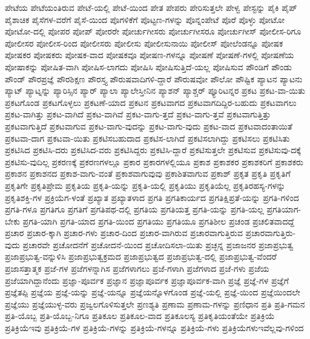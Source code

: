 {ಪೇಟೆಯ
ಪೇಟೆಯಂತಿರುವ
ಪೇಟೆ-ಯಲ್ಲಿ
ಪೇಟೆ-ಯಿಂದ
ಪೇತ
ಪೇಪರು
ಪೇರಿಸುತ್ತಲೇ
ಪೇಳ್ವ
ಪೇಸ್ಟನ್ನು
ಪೈಕಿ
ಪೈಪ್
ಪೈಶಾಚಿಕ
ಪೈಸೆಗಳ-ವರೆಗೆ
ಪೈಸೆ-ಯಿಂದ
ಪೊಗಳಿಕೆಗೆ
ಪೊಟ್ಟಣ-ಗಳನ್ನು
ಪೊನ್ನಂಪೇಟೆ
ಪೊರೆ
ಪೊಳ್ಳು
ಪೋಟೋ
ಪೋಟೋ-ದಲ್ಲಿ
ಪೋಪರ
ಪೋಪ್
ಪೋರರೇ
ಪೋರ್ಚುಗೀಸರು
ಪೋರ್ಚುಗೀಸರೂ
ಪೋರ್ಚುಗೀಸ್
ಪೋಲೀಸ-ರಿಗೂ
ಪೋಲೀಸರ
ಪೋಲೀಸ-ರಿಂದ
ಪೋಲೀಸರು
ಪೋಲೀಸು
ಪೋಲೀಸುನಾಯಿ
ಪೋಲೀಸ್
ಪೋಲೆಂಡನ್ನೂ
ಪೋಷಕ
ಪೋಷಕರ
ಪೋಷಕರು
ಪೋಷಕ-ವಾದ
ಪೋಷಕವೂ
ಪೋಷಣ-ಗಳನ್ನೂ
ಪೋಷಣೆ
ಪೋಷಣೆ-ಗಳಲ್ಲಿ
ಪೋಷಣೆಯ
ಪೋಷಾಕನ್ನು
ಪೋಷಿತ-ವಾಗಿ
ಪೋಷಿಸ-ಲಾಗದು
ಪೋಷಿಸಿ
ಪೋಷಿಸುತ್ತಿದೆ-ಯಲ್ಲ
ಪೋಷಿಸುವ
ಪೌಂಡಿಗೆ
ಪೌಂಡು
ಪೌಂಡ್
ಪೌರಪ್ರಜ್ಞೆ
ಪೌರಶಿಕ್ಷಣ
ಪೌರಸ್ತ್ಯ
ಪೌರುಷವಾದಿಗಳಿ-ದ್ದಾರೆ
ಪೌರುಷವೋ
ಪೌಲೋ
ಪೌಷ್ಟಿಕ
ಪ್ಯಾಟನ
ಪ್ಯಾಟನು
ಪ್ಯಾಟ್
ಪ್ಯಾಟ್ನನ್ನು
ಪ್ಯಾರಿಸ್ಸಿನ
ಪ್ಯಾರ್
ಪ್ಯಾಲಾ
ಪ್ಯಾಲೇಸ್ತೀನಿನ
ಪ್ಯಾಶನ್
ಪ್ಯಾಶ್ಚರ್
ಪ್ಯೂರಿಟನ್ನರ
ಪ್ರಕಟ
ಪ್ರಕಟ-ವಾ-ಯಿತು
ಪ್ರಕಟಗೊಂಡ
ಪ್ರಕಟಗೊಳ್ಳಲು
ಪ್ರಕಟಣೆ-ಯಾದ
ಪ್ರಕಟನ
ಪ್ರಕಟವಾಗದ
ಪ್ರಕಟವಾಗದಿದ್ದಿರ-ಬಹುದು
ಪ್ರಕಟವಾಗಲು
ಪ್ರಕಟ-ವಾಗಿತ್ತು
ಪ್ರಕಟ-ವಾಗಿದೆ
ಪ್ರಕಟ-ವಾಗಿವೆ
ಪ್ರಕಟ-ವಾಗು-ತ್ತದೆ
ಪ್ರಕಟ-ವಾಗು-ತ್ತವೆ
ಪ್ರಕಟವಾಗುತ್ತಿತ್ತು
ಪ್ರಕಟವಾಗುತ್ತಿದೆ
ಪ್ರಕಟವಾಗುವ
ಪ್ರಕಟ-ವಾಗು-ವುದನ್ನು
ಪ್ರಕಟ-ವಾಗು-ವುದು
ಪ್ರಕಟ-ವಾದ
ಪ್ರಕಟವಾದಂತಾಯಿತೆ
ಪ್ರಕಟವಾ-ದಾಗ
ಪ್ರಕಟವಾ-ಯಿತು
ಪ್ರಕಟಿಸಬಹುದಾದ
ಪ್ರಕಟಿಸ-ಲಾಗಿದೆ
ಪ್ರಕಟಿಸಲಾಗಿದ್ದು
ಪ್ರಕಟಿಸಲು
ಪ್ರಕಟಿಸಿತು
ಪ್ರಕಟಿಸಿದ
ಪ್ರಕಟಿಸಿ-ದರು
ಪ್ರಕಟಿಸಿದ-ವರು
ಪ್ರಕಟಿಸಿದ್ದರು
ಪ್ರಕಟಿಸಿ-ದ್ದಾರೆ
ಪ್ರಕಟಿಸುತ್ತಲೇ
ಪ್ರಕಟಿಸುವ
ಪ್ರಕಟಿಸುವು-ದಕ್ಕೆ
ಪ್ರಕಟಿಸು-ವುದಿಲ್ಲ
ಪ್ರಕರಣಕ್ಕೆ
ಪ್ರಕರಣಗಳಲ್ಲೂ
ಪ್ರಕಾರ
ಪ್ರಕಾರಗಳಲ್ಲಿಯೂ
ಪ್ರಕಾಶ
ಪ್ರಕಾಶಕರ
ಪ್ರಕಾಶಕರಿಗೆ
ಪ್ರಕಾಶಕರು
ಪ್ರಕಾಶನ
ಪ್ರಕಾಶನದ
ಪ್ರಕಾಶ-ವಾಗು-ವಂತೆ
ಪ್ರಕಾಶವಾಗುವುವು
ಪ್ರಕಾಶಿತವಾಗುವ
ಪ್ರಕಾಶ್
ಪ್ರಕೃತ
ಪ್ರಕೃತಿ
ಪ್ರಕೃತಿಗೆ
ಪ್ರಕೃತಿಗೇ
ಪ್ರಕೃತಿಪ್ರೇಮ
ಪ್ರಕೃತಿಯ
ಪ್ರಕೃತಿ-ಯನ್ನು
ಪ್ರಕೃತಿ-ಯಲ್ಲಿ
ಪ್ರಕೃತಿಯು
ಪ್ರಕೃತಿಯೆಲ್ಲ
ಪ್ರಕೃತಿರಹಸ್ಯ-ಗಳನ್ನು
ಪ್ರಕೃತಿಶಕ್ತಿ-ಗಳ
ಪ್ರಕ್ರಿಯೆಗ-ಳಂತೆ
ಪ್ರಖ್ಯಾತ
ಪ್ರಖ್ಯಾತಳಾದ
ಪ್ರಗತಿ
ಪ್ರಗತಿಕಾರ್ಯದ
ಪ್ರಗತಿಕ್ಷಿಪ್ರತೆ-ಯನ್ನು
ಪ್ರಗತಿ-ಗಳಿಂದ
ಪ್ರಗತಿ-ಗಳೂ
ಪ್ರಗತಿಗೂ
ಪ್ರಗತಿಗೆ
ಪ್ರಗತಿಪಥ-ದಲ್ಲಿ
ಪ್ರಗತಿಯ
ಪ್ರಗತಿಯತ್ತ
ಪ್ರಗತಿ-ಯನ್ನು
ಪ್ರಗತಿ-ಯಲ್ಲ
ಪ್ರಗತಿಯಾಗ-ಬೇಕು
ಪ್ರಗತಿ-ಯಾಗಿ
ಪ್ರಗತಿ-ಯಾದ
ಪ್ರಗತಿ-ಯಿಂದ
ಪ್ರಗತಿಯು
ಪ್ರಗತಿಯೂ
ಪ್ರಗತಿಶೀಲ
ಪ್ರಚಂಡ
ಪ್ರಚಲಿತವಾದದ್ದೆ
ಪ್ರಚಾರ
ಪ್ರಚಾರ-ಕ್ಕಾಗಿ
ಪ್ರಚಾರ-ಗಳು
ಪ್ರಚಾರ-ದಿಂದ
ಪ್ರಚಾರ-ವಾಗಿರುವ
ಪ್ರಚಾರವಾಗುತ್ತಿರುವ
ಪ್ರಚಾರವಾಗುತ್ತಿರು-ವುದು
ಪ್ರಚಾರವೇ
ಪ್ರಚೋದನೆಗೆ
ಪ್ರಚೋದನೆ-ಯಿಂದ
ಪ್ರಚೋದಿಸಲಾ-ಯಿತು
ಪ್ರಚ್ಛನ್ನ
ಪ್ರಜಾಜನರ
ಪ್ರಜಾಪ್ರಭುತ್ವ
ಪ್ರಜಾಪ್ರಭುತ್ವ-ವನ್ನುಳಿಸಿ
ಪ್ರಜಾಪ್ರಭುತ್ವಕ್ರಮದ
ಪ್ರಜಾಪ್ರಭುತ್ವದ
ಪ್ರಜಾಪ್ರಭುತ್ವ-ದಲ್ಲಿ
ಪ್ರಜಾಪ್ರಭುತ್ವ-ವೆಂದರೆ
ಪ್ರಜಾಸತ್ತಾತ್ಮಕ
ಪ್ರಜೆ-ಗಳ
ಪ್ರಜೆಗಳನ್ನಾಗಿಸ
ಪ್ರಜೆಗಳಾಗಲು
ಪ್ರಜೆ-ಗಳಾಗಿ
ಪ್ರಜೆಗಳಾದ
ಪ್ರಜೆ-ಗಳು
ಪ್ರಜೆಯ
ಪ್ರಜೆಯಾಗಿದ್ದಾನೆಂದು
ಪ್ರಜ್ಞಾ-ಪೂರ್ವಕ
ಪ್ರಜ್ಞಾನ
ಪ್ರಜ್ಞಾಪೂರ್ವಕ
ಪ್ರಜ್ಞಾಪೂರ್ವಕ-ವಾಗಿ
ಪ್ರಜ್ಞೆ
ಪ್ರಜ್ಞೆ-ಗಳ
ಪ್ರಜ್ಞೆಗೆ
ಪ್ರಜ್ಞೆತಪ್ಪಿ
ಪ್ರಜ್ಞೆಯ
ಪ್ರಜ್ಞೆ-ಯನ್ನು
ಪ್ರಜ್ಞೆ-ಯನ್ನೂ
ಪ್ರಜ್ಞೆಯನ್ನೊಳಗೊಂಡ
ಪ್ರಜ್ಞೆ-ಯಲ್ಲಿ
ಪ್ರಜ್ಞೆ-ಯಿಂದ
ಪ್ರಜ್ಞೆಯಿಂದಲೇ
ಪ್ರಜ್ಞೆಯು
ಪ್ರಜ್ಞೆಯುಳ್ಳ-ವರು
ಪ್ರಜ್ವಲಗೊಳಿಸುತ್ತಲೇ
ಪ್ರಣಶ್ಯತಿ
ಪ್ರಣಾಮ
ಪ್ರಣಾಮ-ಗಳನ್ನು
ಪ್ರಣಿಧಾನ
ಪ್ರತಿ
ಪ್ರತಿ-ಗಮನ
ಪ್ರತಿ-ಯೊಬ್ಬ
ಪ್ರತಿ-ಯೊಬ್ಬ-ನಿಗೂ
ಪ್ರತಿಕೂಲ
ಪ್ರತಿಕೂಲ-ವಾದ
ಪ್ರತಿಕೂಲಸ್ಯ
ಪ್ರತಿಕೃತಿಯಂತೆಯೇ
ಪ್ರತಿಕ್ರಿಯೆ
ಪ್ರತಿಕ್ರಿಯೆಇವು
ಪ್ರತಿಕ್ರಿಯೆ-ಗಳ
ಪ್ರತಿಕ್ರಿಯೆ-ಗಳನ್ನು
ಪ್ರತಿಕ್ರಿಯೆ-ಗಳನ್ನೂ
ಪ್ರತಿಕ್ರಿಯೆ-ಗಳು
ಪ್ರತಿಕ್ರಿಯೆಗಳುಇವೆಲ್ಲವು-ಗಳಿಂದ
}
